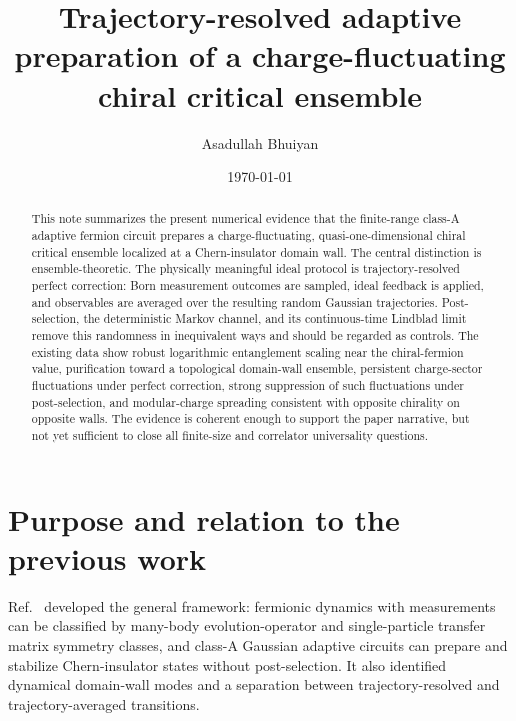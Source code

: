 \documentclass[aps,twocolumn,floatfix,superscriptaddress,nofootinbib]{revtex4-2}
\begin{document}
\title{Trajectory-resolved adaptive preparation of a charge-fluctuating chiral critical ensemble}

\author{Asadullah Bhuiyan}

\date{\today}

\begin{abstract}
This note summarizes the present numerical evidence that the finite-range class-A adaptive
fermion circuit prepares a charge-fluctuating, quasi-one-dimensional chiral critical ensemble
localized at a Chern-insulator domain wall.  The central distinction is ensemble-theoretic.
The physically meaningful ideal protocol is trajectory-resolved perfect correction: Born
measurement outcomes are sampled, ideal feedback is applied, and observables are averaged
over the resulting random Gaussian trajectories.  Post-selection, the deterministic Markov
channel, and its continuous-time Lindblad limit remove this randomness in inequivalent
ways and should be regarded as controls.  The existing data show robust logarithmic
entanglement scaling near the chiral-fermion value, purification toward a topological
domain-wall ensemble, persistent charge-sector fluctuations under perfect correction,
strong suppression of such fluctuations under post-selection, and modular-charge spreading
consistent with opposite chirality on opposite walls.  The evidence is coherent enough to
support the paper narrative, but not yet sufficient to close all finite-size and correlator
universality questions.
\end{abstract}

\maketitle

\section{Purpose and relation to the previous work}

Ref.~\cite{BhuiyanPanJian2026} developed the general framework: fermionic dynamics with
measurements can be classified by many-body evolution-operator and single-particle transfer
matrix symmetry classes, and class-A Gaussian adaptive circuits can prepare and stabilize
Chern-insulator states without post-selection.  It also identified dynamical domain-wall
modes and a separation between trajectory-resolved and trajectory-averaged transitions.
\end{document}
